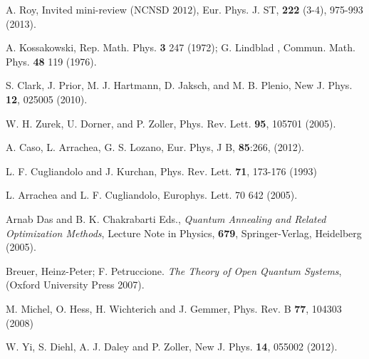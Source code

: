 \documentclass[a4paper,9pt]{article}
\renewenvironment{thebibliography}[1]{%
    \begin{oldthebibliography}{#1}%
      \setlength{\parskip}{0ex}%
      \setlength{\itemsep}{0ex}%
  }%
  {%
    \end{oldthebibliography}%
  }
\begin{document}
\begin{thebibliography}{}
A. Roy, Invited mini-review (NCNSD $2012$),
Eur. Phys. J. ST, {\bf 222} (3-4), 975-993 (2013).

A. Kossakowski, Rep. Math. Phys. {\bf 3} 247 (1972); G. Lindblad , Commun. Math. Phys. {\bf 48} 119 (1976).

S. Clark, J. Prior, M. J. Hartmann, D. Jaksch, and M. B. Plenio, New J. Phys. {\bf 12}, 025005 (2010).

W. H. Zurek, U. Dorner, and P. Zoller, Phys. Rev. Lett. {\bf 95}, 105701 (2005).

A. Caso, L. Arrachea, G. S. Lozano, Eur. Phys, J B, {\bf 85}:266, (2012).

L. F. Cugliandolo and J. Kurchan, Phys. Rev. Lett. {\bf 71}, 173-176 (1993) 

L. Arrachea and L. F. Cugliandolo, Europhys. Lett. 70 642 (2005).

Arnab Das and B. K. Chakrabarti Eds., \textit{Quantum Annealing and Related Optimization Methods}, Lecture Note in Physics, {\bf 679}, Springer-Verlag, Heidelberg (2005).

Breuer, Heinz-Peter; F. Petruccione. \textit{The Theory of Open Quantum Systems}, (Oxford University Press 2007).

M. Michel, O. Hess,  H. Wichterich and J. Gemmer, Phys. Rev. B {\bf 77}, 104303 (2008) 

W. Yi, S. Diehl, A. J. Daley and P. Zoller, New J. Phys. {\bf 14}, 055002 (2012).

\end{thebibliography}
\end{document}
